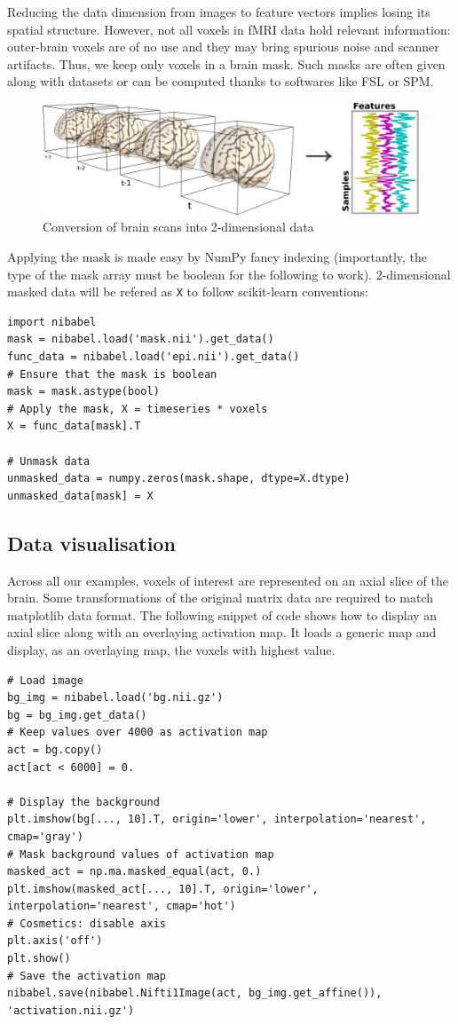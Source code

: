 \documentclass{frontiersSCNS} %
\begin{document}
Reducing the data dimension from images to feature vectors implies losing its
spatial structure. However, not all voxels in fMRI data hold
relevant information: outer-brain voxels are of no
use and they may bring spurious noise and scanner artifacts.
Thus, we keep only voxels in a brain mask. Such masks
are often given along with datasets or can be computed thanks to softwares like
FSL or SPM.

\begin{figure}[hbtp]
    \begin{center}
        \includegraphics[width=.5\linewidth]{img/niimgs.jpg}
    \end{center}
    \caption{Conversion of brain scans into 2-dimensional data}
    \label{fig:niimg}
\end{figure}

Applying the mask is made easy by NumPy fancy indexing (importantly, the
type of the mask array must be boolean for the following to work).
2-dimensional masked data will be refered as \texttt{X} to follow
scikit-learn conventions:
\begin{lstlisting}
import nibabel
mask = nibabel.load('mask.nii').get_data()
func_data = nibabel.load('epi.nii').get_data()
# Ensure that the mask is boolean
mask = mask.astype(bool)
# Apply the mask, X = timeseries * voxels
X = func_data[mask].T

# Unmask data
unmasked_data = numpy.zeros(mask.shape, dtype=X.dtype)
unmasked_data[mask] = X
\end{lstlisting}

\subsection{Data visualisation}

Across all our examples, voxels of interest are represented on an axial slice of
the brain. Some transformations of the original matrix data are required to match
matplotlib data format. The following snippet of code shows how to display an
axial slice along with an overlaying activation map. It loads a generic map and
display, as an overlaying map, the voxels with highest value.

\begin{lstlisting}
# Load image
bg_img = nibabel.load('bg.nii.gz')
bg = bg_img.get_data()
# Keep values over 4000 as activation map
act = bg.copy()
act[act < 6000] = 0.

# Display the background
plt.imshow(bg[..., 10].T, origin='lower', interpolation='nearest', cmap='gray')
# Mask background values of activation map
masked_act = np.ma.masked_equal(act, 0.)
plt.imshow(masked_act[..., 10].T, origin='lower', interpolation='nearest', cmap='hot')
# Cosmetics: disable axis
plt.axis('off')
plt.show()
# Save the activation map
nibabel.save(nibabel.Nifti1Image(act, bg_img.get_affine()), 'activation.nii.gz')
\end{lstlisting}
\end{document}
